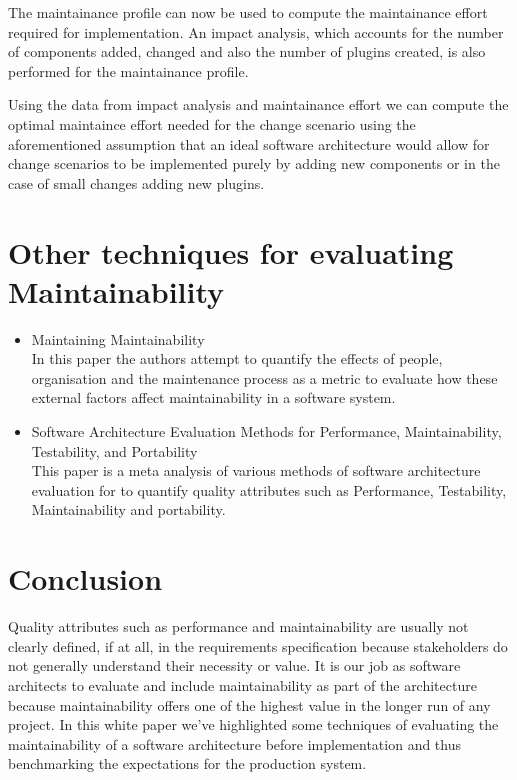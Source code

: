 \documentclass[dvips,12pt]{article}
\begin{document}
The maintainance profile can now be used to compute the maintainance effort required for implementation. An impact analysis, which accounts for the number of components added, changed and also the number of plugins created, is also performed for the maintainance profile. 

Using the data from impact analysis and maintainance effort we can compute the optimal maintaince effort needed for the change scenario using the aforementioned assumption that an ideal software architecture would allow for change scenarios to be implemented purely by adding new components or in the case of small changes adding new plugins. 


\section{Other techniques for evaluating Maintainability}

\begin{itemize}
\item Maintaining Maintainability \cite{ramage_maintaining_1998}\\
In this paper the authors attempt to quantify the effects of people, organisation and the maintenance process as a metric to evaluate how these external factors affect maintainability in a software system.

\item Software Architecture Evaluation Methods for Performance, Maintainability, Testability, and Portability \cite{mattsson_software_2006}\\
This paper is a meta analysis of various methods of software architecture evaluation for to quantify quality attributes such as Performance, Testability, Maintainability and portability.


\end{itemize}

\section{Conclusion}
Quality attributes such as performance and maintainability are usually not clearly defined, if at all, in the requirements specification because stakeholders do not generally understand their necessity or value. It is our job as software architects to evaluate and include maintainability as part of the architecture because maintainability offers one of the highest value in the longer run of any project. In this white paper we've highlighted some techniques of evaluating the maintainability of a software architecture before implementation and thus benchmarking the expectations for the production system.
\end{document}
